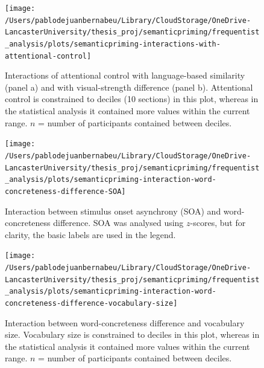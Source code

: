 \documentclass[
  12pt,
  man,floatsintext]{apa7}
\begin{document}
\begin{figure}

{\centering \texttt{[image: /Users/pablodejuanbernabeu/Library/CloudStorage/OneDrive-LancasterUniversity/thesis\_proj/semanticpriming/frequentist\_analysis/plots/semanticpriming-interactions-with-attentional-control]} 

}

\caption{Interactions of attentional control with language-based similarity (panel a) and with visual-strength difference (panel b). Attentional control is constrained to deciles (10 sections) in this plot, whereas in the statistical analysis it contained more values within the current range. \(n\) = number of participants contained between deciles.}\label{fig:semanticpriming-interactions-with-attentional-control}
\end{figure}

\begin{figure}

{\centering \texttt{[image: /Users/pablodejuanbernabeu/Library/CloudStorage/OneDrive-LancasterUniversity/thesis\_proj/semanticpriming/frequentist\_analysis/plots/semanticpriming-interaction-word-concreteness-difference-SOA]} 

}

\caption{Interaction between stimulus onset asynchrony (SOA) and word-concreteness difference. SOA was analysed using $z$-scores, but for clarity, the basic labels are used in the legend.}\label{fig:semanticpriming-interaction-word-concreteness-difference-SOA}
\end{figure}



\begin{figure}

{\centering \texttt{[image: /Users/pablodejuanbernabeu/Library/CloudStorage/OneDrive-LancasterUniversity/thesis\_proj/semanticpriming/frequentist\_analysis/plots/semanticpriming-interaction-word-concreteness-difference-vocabulary-size]} 

}

\caption{Interaction between word-concreteness difference and vocabulary size. Vocabulary size is constrained to deciles in this plot, whereas in the statistical analysis it contained more values within the current range. \(n\) = number of participants contained between deciles.}\label{fig:semanticpriming-interaction-word-concreteness-difference-vocabulary-size}
\end{figure}
\end{document}
